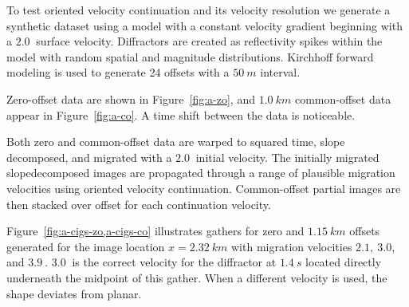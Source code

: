 To test oriented velocity continuation and its velocity resolution
we generate a synthetic dataset using a model with a constant velocity gradient beginning
with a $2.0\ $\old{$[km/s]$} surface velocity.
Diffractors are created as reflectivity spikes within the model with random spatial and magnitude distributions.  Kirchhoff forward modeling is used to generate 24 offsets with a $50\ m$ interval.

Zero-offset data are shown in Figure~\ref{fig:a-zo}, and $1.0\ km$ common-offset data appear in Figure~\ref{fig:a-co}. A time shift between the data is noticeable. 

Both zero and common-offset data are warped to squared time, slope decomposed,
and migrated with a $2.0\ $\old{$[km/s]$} initial velocity.
The initially migrated slope\old{-}\new{ }decomposed images are propagated
through a range of plausible migration velocities using oriented velocity continuation. 
Common-offset partial images are then stacked over offset for each continuation velocity.


Figure~\ref{fig:a-cigs-zo,a-cigs-co} illustrates  gathers for zero and $1.15\ km$
offsets generated for the image location $x = 2.32\ km$ with migration velocities $2.1,\ 3.0$, and $3.9\ $\old{$[km/s]$}. $3.0\ $\old{$[km/s]$} is the correct velocity for the diffractor at $1.4\ s$ located directly underneath the midpoint of this gather.
When a different velocity is used,
the shape deviates from planar.

